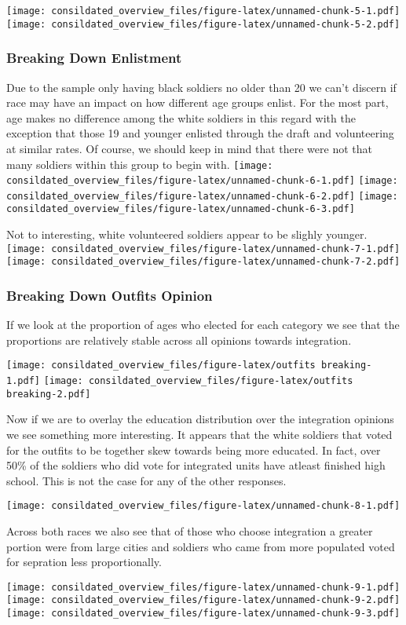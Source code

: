 \documentclass[]{article}
\begin{document}
\texttt{[image: consildated\_overview\_files/figure-latex/unnamed-chunk-5-1.pdf]}
\texttt{[image: consildated\_overview\_files/figure-latex/unnamed-chunk-5-2.pdf]}

\subsubsection{Breaking Down Enlistment}\label{breaking-down-enlistment}

Due to the sample only having black soldiers no older than 20 we can't
discern if race may have an impact on how different age groups enlist.
For the most part, age makes no difference among the white soldiers in
this regard with the exception that those 19 and younger enlisted
through the draft and volunteering at similar rates. Of course, we
should keep in mind that there were not that many soldiers within this
group to begin with.
\texttt{[image: consildated\_overview\_files/figure-latex/unnamed-chunk-6-1.pdf]}
\texttt{[image: consildated\_overview\_files/figure-latex/unnamed-chunk-6-2.pdf]}
\texttt{[image: consildated\_overview\_files/figure-latex/unnamed-chunk-6-3.pdf]}

Not to interesting, white volunteered soldiers appear to be slighly
younger.
\texttt{[image: consildated\_overview\_files/figure-latex/unnamed-chunk-7-1.pdf]}
\texttt{[image: consildated\_overview\_files/figure-latex/unnamed-chunk-7-2.pdf]}

\subsubsection{Breaking Down Outfits
Opinion}\label{breaking-down-outfits-opinion}

If we look at the proportion of ages who elected for each category we
see that the proportions are relatively stable across all opinions
towards integration.

\texttt{[image: consildated\_overview\_files/figure-latex/outfits breaking-1.pdf]}
\texttt{[image: consildated\_overview\_files/figure-latex/outfits breaking-2.pdf]}

Now if we are to overlay the education distribution over the integration
opinions we see something more interesting. It appears that the white
soldiers that voted for the outfits to be together skew towards being
more educated. In fact, over 50\% of the soldiers who did vote for
integrated units have atleast finished high school. This is not the case
for any of the other responses.

\texttt{[image: consildated\_overview\_files/figure-latex/unnamed-chunk-8-1.pdf]}

Across both races we also see that of those who choose integration a
greater portion were from large cities and soldiers who came from more
populated voted for sepration less proportionally.

\texttt{[image: consildated\_overview\_files/figure-latex/unnamed-chunk-9-1.pdf]}
\texttt{[image: consildated\_overview\_files/figure-latex/unnamed-chunk-9-2.pdf]}
\texttt{[image: consildated\_overview\_files/figure-latex/unnamed-chunk-9-3.pdf]}
\end{document}
